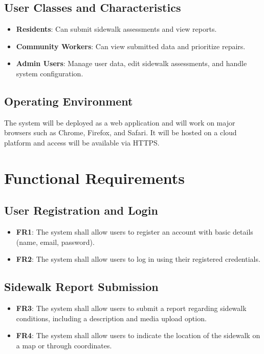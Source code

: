 \documentclass[a4paper,12pt]{article}
\begin{document}
\subsection{User Classes and Characteristics}
\begin{itemize}
    \item \textbf{Residents}: Can submit sidewalk assessments and view reports.
    \item \textbf{Community Workers}: Can view submitted data and prioritize repairs.
    \item \textbf{Admin Users}: Manage user data, edit sidewalk assessments, and handle system configuration.
\end{itemize}

\subsection{Operating Environment}
The system will be deployed as a web application and will work on major browsers such as Chrome, Firefox, and Safari. It will be hosted on a cloud platform and access will be available via HTTPS.

\newpage
\section{Functional Requirements}

\subsection{User Registration and Login}
\begin{itemize}
    \item \textbf{FR1}: The system shall allow users to register an account with basic details (name, email, password).
    \item \textbf{FR2}: The system shall allow users to log in using their registered credentials.
\end{itemize}

\subsection{Sidewalk Report Submission}
\begin{itemize}
    \item \textbf{FR3}: The system shall allow users to submit a report regarding sidewalk conditions, including a description and media upload option.
    \item \textbf{FR4}: The system shall allow users to indicate the location of the sidewalk on a map or through coordinates.
\end{itemize}
\end{document}
